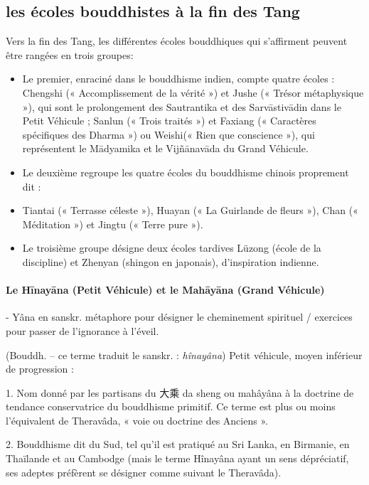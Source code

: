 \subsection{les écoles bouddhistes à la fin des Tang}

Vers la fin des Tang, les différentes écoles bouddhiques qui s’affirment peuvent être rangées en trois groupes:
\begin{itemize}
    \item Le premier, enraciné dans le bouddhisme indien, compte quatre écoles : Chengshi (« Accomplissement de la vérité ») et Jushe (« Trésor métaphysique »), qui sont le prolongement des Sautrantika et des Sarvāstivādin dans le Petit Véhicule ; Sanlun (« Trois traités ») et Faxiang (« Caractères spécifiques des Dharma ») ou Weishi(« Rien que conscience »), qui représentent le Mādyamika et le Vijñānavāda du Grand Véhicule.
    \item Le deuxième regroupe les quatre écoles du bouddhisme chinois proprement dit :
    \item Tiantai (« Terrasse céleste »), Huayan (« La Guirlande de fleurs »), Chan (« Méditation ») et Jingtu (« Terre pure »).
    \item Le troisième groupe désigne deux écoles tardives Lüzong (école de la discipline) et Zhenyan (shingon en japonais), d’inspiration indienne.
\end{itemize}


\paragraph{Le Hīnayāna (Petit Véhicule) et le Mahāyāna (Grand Véhicule)}

\begin{Def}[véhicule ] - Yâna en sanskr.
    métaphore pour désigner le cheminement spirituel / exercices pour passer de l'ignorance à l'éveil.
\end{Def}




\begin{Def}[xiaosheng 小乘]
    (Bouddh. – ce terme traduit le sanskr. : \textit{hînayâna}) Petit véhicule, moyen inférieur de progression :	
    
    1. Nom donné par les partisans du 大乘 da sheng ou mahâyâna à la doctrine de tendance conservatrice du bouddhisme primitif. Ce terme est plus ou moins l’équivalent de Theravâda, « voie ou doctrine des Anciens ». 
    
    2. Bouddhisme dit du Sud, tel qu’il est pratiqué au Sri Lanka, en Birmanie, en Thaïlande et au Cambodge (mais le terme Hînayâna ayant un sens dépréciatif, ses adeptes préfèrent se désigner comme suivant le Theravâda).
\end{Def}

